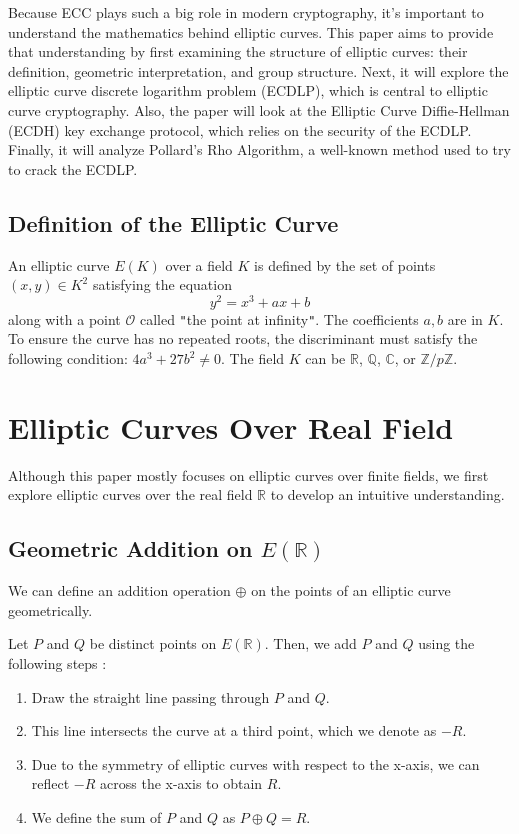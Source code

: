 \documentclass[11pt]{article}
\begin{document}
\vspace{0.3cm}

Because ECC plays such a big role in modern cryptography, it’s important to understand the mathematics behind elliptic curves. This paper aims to provide that understanding by first examining the structure of elliptic curves: their definition, geometric interpretation, and group structure. Next, it will explore the elliptic curve discrete logarithm problem (ECDLP), which is central to elliptic curve cryptography. Also, the paper will look at the Elliptic Curve Diffie-Hellman (ECDH) key exchange protocol, which relies on the security of the ECDLP. Finally, it will analyze Pollard’s Rho Algorithm, a well-known method used to try to crack the ECDLP.


\subsection{Definition of the Elliptic Curve}
An elliptic curve \(E(K)\) over a field \(K\) is defined by the set of points \((x,y)\in K^2\) satisfying the equation
\[ y^2 = x^3 + ax + b\] along with a point \(\mathcal{O}\) called \texttt{"}the point at infinity\texttt{"}\cite{shevchuk}. The coefficients \( a, b\) are in \(K\). To ensure the curve has no repeated roots, the discriminant must satisfy the following condition: \(4a^3 + 27b^2 \neq 0\).
The field \( K \) can be \( \mathbb{R} \), \( \mathbb{Q} \), \( \mathbb{C} \), or \( \mathbb{Z}/p\mathbb{Z} \).




\section{Elliptic Curves Over Real Field}
Although this paper mostly focuses on elliptic curves over finite fields, we first explore elliptic curves over the real field \( \mathbb{R} \) to develop an intuitive understanding.  

\subsection{Geometric Addition on \( E(\mathbb{R}) \)} 
We can define an addition operation \( \oplus \) on the points of an elliptic curve geometrically.

\vspace{0.3cm}

Let \( P \) and \( Q \) be distinct points on \( E(\mathbb{R}) \). Then, we add \(P\) and \(Q\) using the following steps \cite{shevchuk}:
\begin{enumerate}
    \item Draw the straight line passing through \( P \) and \( Q \).
    \item This line intersects the curve at a third point, which we denote as \( -R \).
    \item Due to the symmetry of elliptic curves with respect to the x-axis, we can reflect \( -R \) across the x-axis to obtain \( R \).
    \item We define the sum of \( P \) and \( Q \) as \( P \oplus Q = R \).
\end{enumerate}
\end{document}

